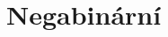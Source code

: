 \documentclass[czech,bachelor,dept470,male]{diploma}
\begin{document}





\section{Negabinární}
\end{document}
